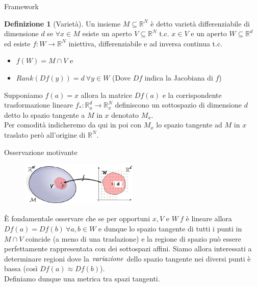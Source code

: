 \documentclass[usenames,dvipsnames,9pt]{beamer}
\newcommand{\RR}{\mathbb{R}}
\theoremstyle{definition}
\newtheorem{deff}{Definizione}
\begin{document}
\begin{frame}{Framework}
\begin{deff}[Varietà]
Un insieme $M\subseteq\RR^{N}$ è detto varietà differenziabile di dimensione $d$ se $\forall x\in M$ esiste un aperto $V\subseteq\RR^{N}$ t.c. $x\in V$ e un aperto $W\subseteq\RR^d$ ed esiste $f:W\to\RR^{N}$ iniettiva, differenziabile e ad inversa continua t.c.
\begin{itemize}
  \item $f(W)=M\cap V$ e
  \item $Rank(Df(y)) = d\ \forall y\in W$ (Dove $Df$ indica la Jacobiana di $f$)
\end{itemize}
\end{deff}
Supponiamo $f(a)=x$ allora la matrice $Df(a)$ e la corrispondente trasformazione lineare $f_{*}:\RR^{d}_{a}\to \RR^{N}_{x}$ definiscono un sottospazio di dimensione $d$ detto lo spazio tangente a $M$ in $x$ denotato $M_{x}$. \\
Per comodità indicheremo da qui in poi con $M_x$ lo spazio tangente ad $M$ in $x$ traslato però all'origine di $\RR^N$.
\end{frame}

\begin{frame}{Osservazione motivante}
\begin{figure}[b]
\centering
\includegraphics[width=0.5\textwidth]{graphics/manifold.eps}
\end{figure}

È fondamentale osservare che se per opportuni $x, V$ e $W \ f$ è lineare allora $Df(a)=Df(b) \ \forall a, b\in W$ e dunque lo spazio tangente di tutti i punti in $M\cap V$ coincide (a meno di una traslazione) e la regione di spazio può essere perfettamente rappresentata con dei sottospazi affini.
Siamo allora interessati a determinare regioni dove la $\it{variazione}$ dello spazio tangente nei diversi punti è bassa (così $Df(a)\approx Df(b)$). \\
Definiamo dunque una metrica tra spazi tangenti.
\end{frame}
\end{document}
